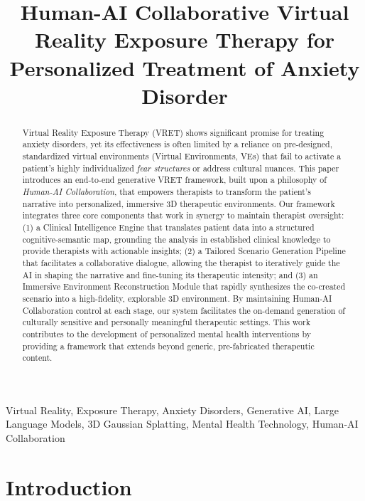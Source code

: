 \documentclass[]{interact}
\begin{document}

\title{Human-AI Collaborative Virtual Reality Exposure Therapy for Personalized Treatment of Anxiety Disorder}

\author{
\affil{~}
}

\maketitle

\begin{abstract}
Virtual Reality Exposure Therapy (VRET) shows significant promise for treating anxiety disorders, yet its effectiveness is often limited by a reliance on pre-designed, standardized virtual environments (Virtual Environments, VEs) that fail to activate a patient's highly individualized \emph{fear structures} or address cultural nuances. This paper introduces an end-to-end generative VRET framework, built upon a philosophy of \emph{Human-AI Collaboration}, that empowers therapists to transform the patient's narrative into personalized, immersive 3D therapeutic environments. Our framework integrates three core components that work in synergy to maintain therapist oversight: (1) a Clinical Intelligence Engine that translates patient data into a structured cognitive-semantic map, grounding the analysis in established clinical knowledge to provide therapists with actionable insights; (2) a Tailored Scenario Generation Pipeline that facilitates a collaborative dialogue, allowing the therapist to iteratively guide the AI in shaping the narrative and fine-tuning its therapeutic intensity; and (3) an Immersive Environment Reconstruction Module that rapidly synthesizes the co-created scenario into a high-fidelity, explorable 3D environment. By maintaining Human-AI Collaboration control at each stage, our system facilitates the on-demand generation of culturally sensitive and personally meaningful therapeutic settings. This work contributes to the development of personalized mental health interventions by providing a framework that extends beyond generic, pre-fabricated therapeutic content.
\end{abstract}

\begin{keywords}
Virtual Reality, Exposure Therapy, Anxiety Disorders, Generative AI, Large Language Models, 3D Gaussian Splatting, Mental Health Technology, Human-AI Collaboration
\end{keywords}

\section{Introduction}
\end{document}
